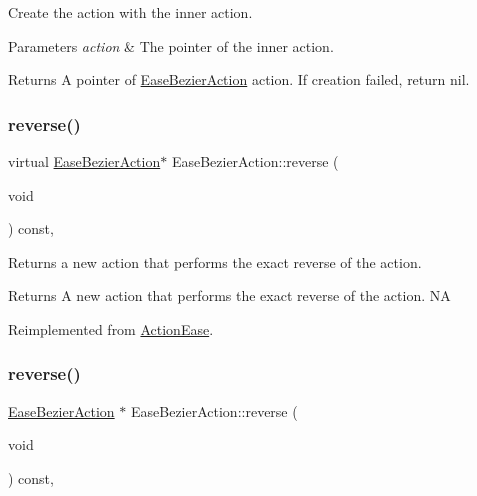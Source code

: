Create the action with the inner action. 


\begin{DoxyParams}{Parameters}
{\em action} & The pointer of the inner action. \\
\hline
\end{DoxyParams}
\begin{DoxyReturn}{Returns}
A pointer of \hyperlink{classEaseBezierAction}{Ease\+Bezier\+Action} action. If creation failed, return nil. 
\end{DoxyReturn}
\mbox{\label{classEaseBezierAction_abf78e7a531e29240728c85b1d1aa0c6b}} 
\subsubsection{\texorpdfstring{reverse()}{reverse()}\hspace{0.1cm}{\footnotesize\ttfamily [1/2]}}
{\footnotesize\ttfamily virtual \hyperlink{classEaseBezierAction}{Ease\+Bezier\+Action}$\ast$ Ease\+Bezier\+Action\+::reverse (\begin{DoxyParamCaption}\item[{void}]{ }\end{DoxyParamCaption}) const\hspace{0.3cm}{\ttfamily [override]}, {\ttfamily [virtual]}}

Returns a new action that performs the exact reverse of the action.

\begin{DoxyReturn}{Returns}
A new action that performs the exact reverse of the action.  NA 
\end{DoxyReturn}


Reimplemented from \hyperlink{classActionEase_ab99eb083fa033fae1d6c948fdc730782}{Action\+Ease}.

\mbox{\label{classEaseBezierAction_ad6a92ab332d64dcdbbd3b7db4cf2464c}} 
\subsubsection{\texorpdfstring{reverse()}{reverse()}\hspace{0.1cm}{\footnotesize\ttfamily [2/2]}}
{\footnotesize\ttfamily \hyperlink{classEaseBezierAction}{Ease\+Bezier\+Action} $\ast$ Ease\+Bezier\+Action\+::reverse (\begin{DoxyParamCaption}\item[{void}]{ }\end{DoxyParamCaption}) const\hspace{0.3cm}{\ttfamily [override]}, {\ttfamily [virtual]}}

